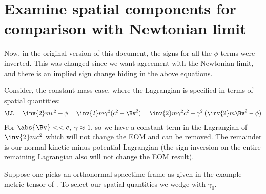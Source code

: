 \section{Examine spatial components for comparison with Newtonian limit}

Now, in the original version of this document, the signs for all the \(\phi\) terms were inverted.  This was changed since we want agreement with the Newtonian limit, and there is an implied sign change hiding in the above equations.

Consider, the constant mass case, where the Lagrangian is specified in terms of spatial quantities:
%
\begin{equation*}
\LL = \inv{2} m v^2 + \phi = \inv{2} m \gamma^2 ( c^2 - \Bv^2 ) = \inv{2} m \gamma^2 c^2 - \gamma^2\left( \inv{2} m \Bv^2 - \phi \right)
\end{equation*}
%
For \(\abs{\Bv} << c\), \(\gamma \approx 1\), so we have a constant term in the Lagrangian of \(\inv{2} m c^2\) which will not change the
EOM and can be removed.  The remainder is our normal kinetic minus potential Lagrangian (the sign inversion on the entire remaining Lagrangian also will not change the EOM result).

Suppose one picks an orthonormal
spacetime frame as given in the example metric tensor of .  To select our spatial quantities
we wedge with \(\gamma_0\).

